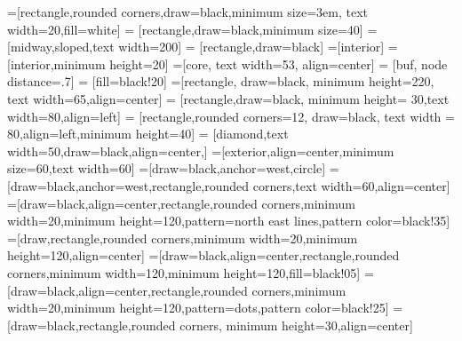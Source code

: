 \usepackage{listingsutf8}
\lstset{inputencoding=utf8/latin1}
\lstset{tabsize=4}
\usepackage{caption}
\usepackage{subcaption}
\usepackage{enumerate}
\usepackage{lineno}
\usepackage{array}
\usepackage{booktabs}
\usepackage[titletoc]{appendix}
\usepackage[binary-units]{siunitx}
\usepackage{titling}
\usepackage{soul}
\usepackage{adjustbox}

\usepackage{hyperref}

\usepackage{tikz}
\usetikzlibrary{arrows,backgrounds,decorations.pathreplacing,fit,positioning,petri,babel,shapes,circuits.logic.mux,circuits.logic.US,shapes.gates.logic,trees,patterns}

=[rectangle,rounded corners,draw=black,minimum size=3em, text width=20,fill=white]
 = [rectangle,draw=black,minimum size=40]
 = [midway,sloped,text width=200]
 = [rectangle,draw=black]
=[interior]
 = [interior,minimum height=20]
=[core, text width=53, align=center]
 = [buf, node distance=.7]
 = [fill=black!20]
=[rectangle, draw=black, minimum height=220, text width=65,align=center]
 = [rectangle,draw=black, minimum height= 30,text width=80,align=left]
 = [rectangle,rounded corners=12, draw=black, text width = 80,align=left,minimum height=40]
 = [diamond,text width=50,draw=black,align=center,]
=[exterior,align=center,minimum size=60,text width=60]
=[draw=black,anchor=west,circle]
=[draw=black,anchor=west,rectangle,rounded corners,text width=60,align=center]
=[draw=black,align=center,rectangle,rounded corners,minimum width=20,minimum height=120,pattern=north east lines,pattern color=black!35]
=[draw,rectangle,rounded corners,minimum width=20,minimum height=120,align=center]
=[draw=black,align=center,rectangle,rounded corners,minimum width=120,minimum height=120,fill=black!05]
=[draw=black,align=center,rectangle,rounded corners,minimum width=20,minimum height=120,pattern=dots,pattern color=black!25]
=[draw=black,rectangle,rounded corners, minimum height=30,align=center]

\newcommand{\epg}[3]{
	Buffer {#1}\\
	[38.5pt]EP{#2}\\
	[38.5pt]{#3} Bytes}

